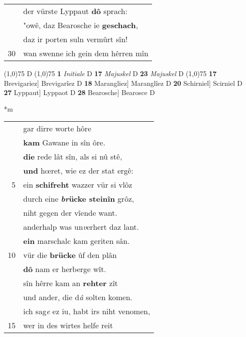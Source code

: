 \documentclass[8pt,a4paper,notitlepage]{article}
\begin{document}
\begin{table}[ht]
\begin{minipage}[t]{0.5\linewidth}
\begin{tabular}{rl}
 & der vürste Lyppaut \textbf{dô} sprach:\\ 
 & "owê, daz Bearosche ie \textbf{geschach},\\ 
 & daz ir porten suln vermûrt sîn!\\ 
30 & wan swenne ich gein dem hêrren mîn\\ 
\end{tabular}
\scriptsize
\line(1,0){75} \newline
D \newline
\line(1,0){75} \newline
\textbf{1} \textit{Initiale} D  \textbf{17} \textit{Majuskel} D  \textbf{23} \textit{Majuskel} D  \newline
\line(1,0){75} \newline
\textbf{17} Brevigariez] Brevigarîez D \textbf{18} Marangliez] Maranglîez D \textbf{20} Schirniel] Scirniel D \textbf{27} Lyppaut] Lyppaot D \textbf{28} Bearosche] Bearosce D \newline
\end{minipage}
\hspace{0.5cm}
\begin{minipage}[t]{0.5\linewidth}
\small
\begin{center}*m
\end{center}
\begin{tabular}{rl}
 & gar dirre worte hôre\\ 
 & \textbf{kam} Gawane in sîn ôre.\\ 
 & \textbf{die} rede lât sîn, als si nû stê,\\ 
 & \textbf{und} hœret, wie ez der stat ergê:\\ 
5 & ein \textbf{schifreht} wazzer vür si vlôz\\ 
 & durch eine \textbf{\textit{br}ücke steinîn} grôz,\\ 
 & niht gegen der vîende want.\\ 
 & anderhalp was un\textit{v}erhert daz lant.\\ 
 & \textbf{ein} marschalc kam geriten sân.\\ 
10 & vür die \textbf{brücke} ûf den plân\\ 
 & \textbf{dô} nam er herberge wît.\\ 
 & sîn hêrre kam an \textbf{rehter} zît\\ 
 & und ander, die d\textit{â} solten komen.\\ 
 & ich sag\textit{e} ez iu, habt irs niht venomen,\\ 
15 & wer in des wirtes helfe reit\\ 

\end{tabular}
\end{minipage}
\end{table}
\end{document}
